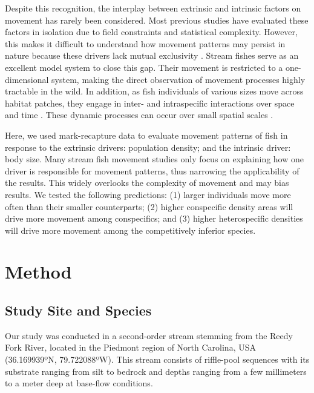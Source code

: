\documentclass[11pt, class=article, crop=false]{standalone}
\begin{document}
Despite this recognition, the interplay between extrinsic and intrinsic factors on movement has rarely been considered. Most previous studies have evaluated these factors in isolation due to field constraints and statistical complexity. However, this makes it difficult to understand how movement patterns may persist in nature because these drivers lack mutual exclusivity \citep{mcmahonLinkingHabitatSelection2006}. Stream fishes serve as an excellent model system to close this gap. Their movement is restricted to a one-dimensional system, making the direct observation of movement processes highly tractable in the wild. In addition, as fish individuals of various sizes move across habitat patches, they engage in inter- and intraspecific interactions over space and time \citep{brownHabitatHeterogeneityActivity2010, davidsonSeasonalSpatialHydrological2012, robinsonEffectsMultiyearExperimental2003, albaneseEcologicalCorrelatesFish2004, nakayamaFinescaleMovementEcology2018, pettyRestrictedMovementMottled2004, robertsSpatiotemporalVariabilityStream2007}. These dynamic processes can occur over small spatial scales \citep{teruiNonrandomDispersalSympatric2021}. 

Here, we used mark-recapture data to evaluate movement patterns of fish in response to the extrinsic drivers: population density; and the intrinsic driver: body size. Many stream fish movement studies only focus on explaining how one driver is responsible for movement patterns, thus narrowing the applicability of the results. This widely overlooks the complexity of movement and may bias results. We tested the following predictions: (1) larger individuals move more often than their smaller counterparts; (2) higher conspecific density areas will drive more movement among conspecifics; and (3) higher heterospecific densities will drive more movement among the competitively inferior species.

\section{Method}

\subsection{Study Site and Species}

Our study was conducted in a second-order stream stemming from the Reedy Fork River, located in the Piedmont region of North Carolina, USA (36.169939ºN, 79.722088ºW). This stream consists of riffle-pool sequences with its substrate ranging from silt to bedrock and depths ranging from a few millimeters to a meter deep at base-flow conditions. 
\end{document}

